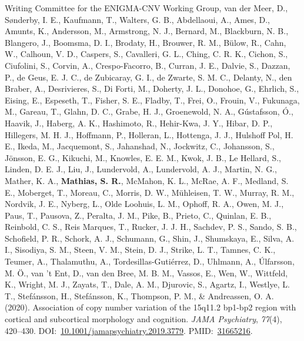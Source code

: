\documentclass[10pt]{article}
\makeatletter
\newlength{\bibhang}
\newlength{\bibsep}
 {\@listi \global\bibsep\itemsep \global\advance\bibsep by\parsep}
\newenvironment{bibsection}%
        {\vspace{-\baselineskip}\begin{list}{}{%
       \setlength{\leftmargin}{\bibhang}%
       \setlength{\itemindent}{-\leftmargin}%
       \setlength{\itemsep}{\bibsep}%
       \setlength{\parsep}{\z@}%
        \setlength{\partopsep}{0pt}%
        \setlength{\topsep}{0pt}}}
        {\end{list}\vspace{-.6\baselineskip}}
\makeatother
\begin{document}
\begin{bibsection}
\item Writing Committee for the ENIGMA-CNV Working Group, van der Meer, D., Sønderby, I. E., Kaufmann, T., Walters, G. B., Abdellaoui, A., Ames, D., Amunts, K., Andersson, M., Armstrong, N. J., Bernard, M., Blackburn, N. B., Blangero, J., Boomsma, D. I., Brodaty, H., Brouwer, R. M., Bülow, R., Cahn, W., Calhoun, V. D., Caspers, S., Cavalleri, G. L., Ching, C. R. K., Cichon, S., Ciufolini, S., Corvin, A., Crespo-Facorro, B., Curran, J. E., Dalvie, S., Dazzan, P., de Geus, E. J. C., de Zubicaray, G. I., de Zwarte, S. M. C., Delanty, N., den Braber, A., Desrivieres, S., Di Forti, M., Doherty, J. L., Donohoe, G., Ehrlich, S., Eising, E., Espeseth, T., Fisher, S. E., Fladby, T., Frei, O., Frouin, V., Fukunaga, M., Gareau, T., Glahn, D. C., Grabe, H. J., Groenewold, N. A., Gústafsson, Ó., Haavik, J., Haberg, A. K., Hashimoto, R., Hehir-Kwa, J. Y., Hibar, D. P., Hillegers, M. H. J., Hoffmann, P., Holleran, L., Hottenga, J. J., Hulshoff Pol, H. E., Ikeda, M., Jacquemont, S., Jahanshad, N., Jockwitz, C., Johansson, S., Jönsson, E. G., Kikuchi, M., Knowles, E. E. M., Kwok, J. B., Le Hellard, S., Linden, D. E. J., Liu, J., Lundervold, A., Lundervold, A. J., Martin, N. G., Mather, K. A., \textbf{Mathias, S. R.}, McMahon, K. L., McRae, A. F., Medland, S. E., Moberget, T., Moreau, C., Morris, D. W., Mühleisen, T. W., Murray, R. M., Nordvik, J. E., Nyberg, L., Olde Loohuis, L. M., Ophoff, R. A., Owen, M. J., Paus, T., Pausova, Z., Peralta, J. M., Pike, B., Prieto, C., Quinlan, E. B., Reinbold, C. S., Reis Marques, T., Rucker, J. J. H., Sachdev, P. S., Sando, S. B., Schofield, P. R., Schork, A. J., Schumann, G., Shin, J., Shumskaya, E., Silva, A. I., Sisodiya, S. M., Steen, V. M., Stein, D. J., Strike, L. T., Tamnes, C. K., Teumer, A., Thalamuthu, A., Tordesillas-Gutiérrez, D., Uhlmann, A., Úlfarsson, M. Ö., van 't Ent, D., van den Bree, M. B. M., Vassos, E., Wen, W., Wittfeld, K., Wright, M. J., Zayats, T., Dale, A. M., Djurovic, S., Agartz, I., Westlye, L. T., Stefánsson, H., Stefánsson, K., Thompson, P. M., \& Andreassen, O. A. (2020). Association of copy number variation of the 15q11.2 bp1-bp2 region with cortical and subcortical morphology and cognition. \emph{JAMA Psychiatry}, \emph{77}(4), 420--430. DOI:~\href{https://doi.org/10.1001/jamapsychiatry.2019.3779}{10.1001/jamapsychiatry.2019.3779}. PMID:~\href{https://www.ncbi.nlm.nih.gov/pubmed/?term=31665216}{31665216}.


\end{bibsection}
\end{document}
